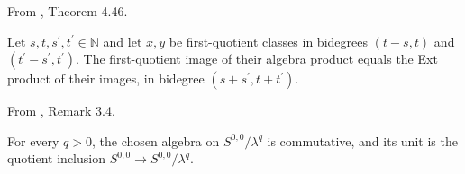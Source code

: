 \begin{theorem}
\label{frontier:Literature:a0113c9a3b80}
From \cite{Pst}, Theorem 4.46.\par

Let $s,t,s^{\prime},t^{\prime}\in\mathbb N$ and let $x,y$ be first-quotient classes in bidegrees $(t-s,t)$ and $(t^{\prime}-s^{\prime},t^{\prime})$. The first-quotient image of their algebra product equals the Ext product of their images, in bidegree $(s+s^{\prime},t+t^{\prime})$.

From \cite{LWX126}, Remark 3.4.\par

For every $q>0$, the chosen algebra on $S^{0,0}/\lambda^q$ is commutative, and its unit is the quotient inclusion $S^{0,0}\to S^{0,0}/\lambda^q$.
\end{theorem}

